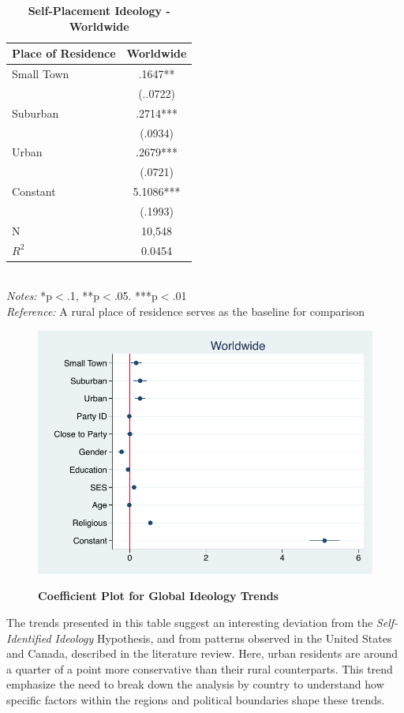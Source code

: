 \documentclass[12pt, titlepage]{article}
\newcommand\e{\emph}
\newcommand\tb{\textbf}
\begin{document}
\begin{singlespace}
	\begin{table}[H]
		\centering
		\caption{\tb{Self-Placement Ideology - Worldwide}}
		\begin{tabulary}{\linewidth}{l c}
			\hline
			\tb{Place of Residence}&\tb{Worldwide} \\
			\hline
			Small Town&.1647**  \\    
			& (..0722)   \\
			Suburban & .2714***\\ 
			& (.0934) \\
			Urban   & .2679***   \\
			& (.0721)    \\
			Constant   & 5.1086***  \\
			&(.1993) \\
			N  & 10,548  \\
			$R^2$	& 0.0454 \\
			\hline                                       
		\end{tabulary}
		\\
		\e{Notes:} *p$<$.1, **p$<$.05. ***p$<$.01 \\
		\e{Reference:} A rural place of residence serves as the baseline for comparison
		\label{table3}
	\end{table}
\end{singlespace}


\begin{figure}[H]    \centering
	{	 \includegraphics[width=.6\textwidth]{CoefAllIdeo}}
	\caption{\tb{Coefficient Plot for Global Ideology Trends}}\label{WorldIdeoCoef}
\end{figure}

The trends presented in this table suggest an interesting deviation from the \e{Self-Identified Ideology} Hypothesis, and from patterns observed in the United States and Canada, described in the literature review. Here, urban residents are around a quarter of a point more conservative than their rural counterparts. This trend emphasize the need to break down the analysis by country to understand how specific factors within the regions and political boundaries shape these trends.
\end{document}
